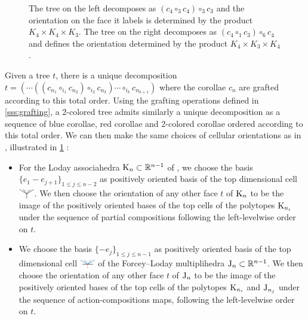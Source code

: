 \documentclass[10pt]{amsart}
\theoremstyle{remark}
\begin{document}
\begin{figure}[h!]

\centering

\begin{subfigure}{0.4\textwidth}
\centering
\exampleleftlevelwiseone
\end{subfigure}
\begin{subfigure}{0.4\textwidth}
\centering
\exampleleftlevelwisetwo
\end{subfigure}

\caption{The tree on the left decomposes as $(c_4\circ_3 c_4)\circ_3 c_3$ and the orientation on the face it labels is determined by the product $K_4 \times K_4 \times K_3$. 
The tree on the right decomposes as $ (c_4\circ_1 c_3)\circ_6 c_4$ and defines the orientation determined by the product $K_4 \times K_3 \times K_4$.} 
\label{fig:left-levelwise-order}
\end{figure}

Given a tree $t$, there is a unique decomposition $t=(\cdots ((c_{n_1} \circ_{i_1} c_{n_2})\circ_{i_2}c_{n_3})\cdots \circ_{i_k} c_{n_{k+1}})$ where the corollae $c_n$ are grafted according to this total order. Using the grafting operations defined in \cref{sss:grafting}, a 2-colored tree admits similarly a unique decomposition as a sequence of blue corollae, red corollae and 2-colored corollae ordered according to this total order. 
We can then make the same choices of cellular orientations as in \cite[Section 1.4]{mazuir-I}, illustrated in \cref{fig:left-levelwise-order} :
\begin{itemize}
  \item For the Loday associahedra $\mathrm{K}_n \subset \mathbb{R}^{n-1}$ of \cite{MTTV19}, we choose the basis $\{e_1 - e_{j+1}\}_{1\leq j \leq n-2}$ as positively oriented basis of the top dimensional cell $\arbreop{0.15}$. We then choose the orientation of any other face $t$ of $\mathrm{K}_n$ to be the image of the positively oriented bases of the top cells of the polytopes $\mathrm{K}_{n_i}$ under the sequence of partial compositions following the left-levelwise order on $t$. 
  \item We choose the basis $\{- e_j\}_{1\leq j \leq n-1}$ as positively oriented basis of the top dimensional cell $\arbreopmorph{0.15}$ of the Forcey--Loday multiplihedra $\mathrm{J}_n \subset \mathbb{R}^{n-1}$. We then choose the orientation of any other face $t$ of $\mathrm{J}_n$ to be the image of the positively oriented bases of the top cells of the polytopes $\mathrm{K}_{n_i}$ and $\mathrm{J}_{n_j}$ under the sequence of action-compositions maps, following the left-levelwise order on $t$.
\end{itemize}
\end{document}
